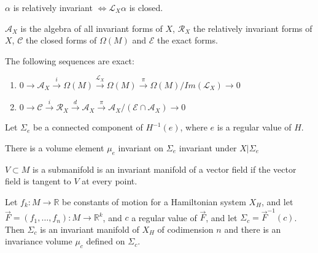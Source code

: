\begin{defn}

$\alpha$ is relatively invariant $\iff \mathcal{L}_X \alpha$ is closed.

\end{defn}

\begin{defn}

$\mathcal{A}_X$ is the algebra of all invariant forms of $X$, $\mathcal{R}_X$ the relatively invariant forms of $X$, $\mathcal{C}$ the closed forms of $\Omega (M)$ and $\mathcal{E}$ the exact forms.

\end{defn}

\begin{thm}

The following sequences are exact:
\begin{enumerate}
    \item $0 \to \mathcal{A}_X \overset{i}{\to} \Omega(M) \overset{\mathcal{L}_X}{\to} \Omega (M) \overset{\pi}{\to} \Omega (M)/ Im(\mathcal{L}_X) \to 0$
    \item $0 \to \mathcal{C} \overset{i}{\to} \mathcal{R}_X \overset{d}{\to} \mathcal{A}_X \overset{\pi}{\to} \mathcal{A}_X / (\mathcal{E} \cap \mathcal{A}_X ) \to 0$
\end{enumerate}
\end{thm}

Let $\Sigma_e$ be a connected component of $H^{-1}(e)$, where $e$ is a regular value of $H$. 

\begin{thm}
There is a volume element $\mu_e$ invariant on $\Sigma_e$ invariant under $X\vert \Sigma_e$
\end{thm}
\begin{defn}

$V \subset M$ is a submanifold is an invariant manifold of a vector field if the vector field is tangent to $V$ at every point.

\end{defn}

\begin{defn}

Let $f_k:M \to \mathbb{R}$ be constants of motion for a Hamiltonian system $X_H$, and let $\Vec{F} = (f_1, \ldots, f_n): M \to \mathbb{R}^k$, and $c$ a regular value of $\Vec{F}$, and let $\Sigma_c = \Vec{F}^{-1}(c)$. Then $\Sigma_c$ is an invariant manifold of $X_H$ of codimension $n$ and there is an invariance volume $\mu_c$ defined on $\Sigma_c$. 

\end{defn}

